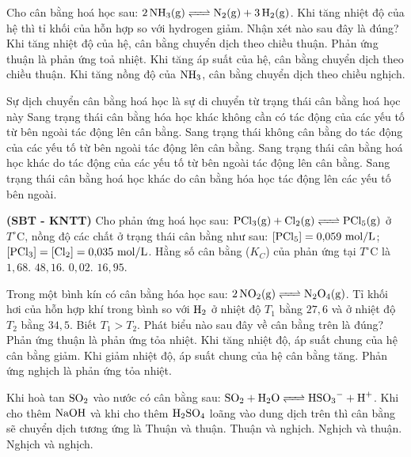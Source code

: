 \documentclass[12pt,a4paper]{article}
\begin{document}
\begin{ex}
Cho cân bằng hoá học sau: $\ce{2NH3(g) <=> N2(g) + 3H2(g)}$. Khi tăng nhiệt độ của hệ thì tỉ khối của hỗn hợp so với hydrogen giảm. Nhận xét nào sau đây là đúng?
\choice
{Khi tăng nhiệt độ của hệ, cân bằng chuyển dịch theo chiều thuận.}
{Phản ứng thuận là phản ứng toả nhiệt.}
{Khi tăng áp suất của hệ, cân bằng chuyển dịch theo chiều thuận.}
{Khi tăng nồng độ của $\ce{NH3}$, cân bằng chuyển dịch theo chiều nghịch.}
\loigiai{}
\end{ex}

\begin{ex}
Sự dịch chuyển cân bằng hoá học là sự di chuyển từ trạng thái cân bằng hoá học này
\choice
{Sang trạng thái cân bằng hóa học khác không cần có tác động của các yếu tố từ bên ngoài tác động lên cân bằng.}
{Sang trạng thái không cân bằng do tác động của các yếu tố từ bên ngoài tác động lên cân bằng.}
{Sang trạng thái cân bằng hoá học khác do tác động của các yếu tố từ bên ngoài tác động lên cân bằng.}
{Sang trạng thái cân bằng hoá học khác do cân bằng hóa học tác động lên các yếu tố bên ngoài.}
\loigiai{}
\end{ex}

\begin{ex}
\textbf{(SBT - KNTT)} Cho phản ứng hoá học sau: $\ce{PCl3(g) + Cl2(g) <=> PCl5(g)}$ ở $T^\circ\text{C}$, nồng độ các chất ở trạng thái cân bằng như sau: $[\ce{PCl5}] = 0{,}059\text{ mol/L}$; $[\ce{PCl3}] = [\ce{Cl2}] = 0{,}035\text{ mol/L}$. Hằng số cân bằng ($K_C$) của phản ứng tại $T^\circ\text{C}$ là
\choice
{$1{,}68.$}
{$48{,}16.$}
{$0{,}02.$}
{$16{,}95.$}
\loigiai{}
\end{ex}

\begin{ex}
Trong một bình kín có cân bằng hóa học sau: $\ce{2NO2(g) <=> N2O4(g)}$. Tỉ khối hơi của hỗn hợp khí trong bình so với $\ce{H2}$ ở nhiệt độ $T_1$ bằng $27{,}6$ và ở nhiệt độ $T_2$ bằng $34{,}5$. Biết $T_1 > T_2$. Phát biểu nào sau đây về cân bằng trên là đúng?
\choice
{Phản ứng thuận là phản ứng tỏa nhiệt.}
{Khi tăng nhiệt độ, áp suất chung của hệ cân bằng giảm.}
{Khi giảm nhiệt độ, áp suất chung của hệ cân bằng tăng.}
{Phản ứng nghịch là phản ứng tỏa nhiệt.}
\loigiai{}
\end{ex}

\begin{ex}
Khi hoà tan $\ce{SO2}$ vào nước có cân bằng sau: $\ce{SO2 + H2O <=> HSO3- + H+}$. Khi cho thêm $\ce{NaOH}$ và khi cho thêm $\ce{H2SO4}$ loãng vào dung dịch trên thì cân bằng sẽ chuyển dịch tương ứng là
\choice
{Thuận và thuận.}
{Thuận và nghịch.}
{Nghịch và thuận.}
{Nghịch và nghịch.}
\loigiai{}
\end{ex}
\end{document}
